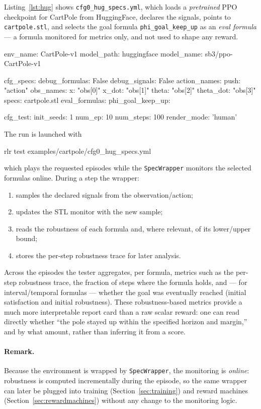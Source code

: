 Listing~\ref{lst:hug} shows \texttt{cfg0\_hug\_specs.yml}, which loads a
\emph{pretrained} PPO checkpoint for CartPole from HuggingFace, declares the
signals, points to \texttt{cartpole.stl}, and selects the goal formula
\texttt{phi\_goal\_keep\_up} as an \emph{eval formula} --- a formula monitored
for metrics only, and not used to shape any reward.

\begin{cfglisting}[caption={Testing a HuggingFace pretrained PPO on CartPole
against an STL formula (\texttt{cfg0\_hug\_specs.yml}).},label={lst:hug}]
env_name: CartPole-v1
model_path: huggingface
model_name: sb3/ppo-CartPole-v1

cfg_specs:
  debug_formulas: False
  debug_signals: False
  action_names:
    push: "action"
  obs_names:
    x:     "obs[0]"
    x_dot: "obs[1]"
    theta: "obs[2]"
    theta_dot: "obs[3]"
  specs: cartpole.stl
  eval_formulas:
    phi_goal_keep_up:

cfg_test:
  init_seeds: 1
  num_ep: 10
  num_steps: 100
  render_mode: 'human'
\end{cfglisting}

\noindent
The run is launched with
\begin{center}\ttfamily rlr test examples/cartpole/cfg0\_hug\_specs.yml
\end{center}
which plays the requested episodes while the \texttt{SpecWrapper} monitors the
selected formulas online. During a step the wrapper:
\begin{enumerate}
  \item samples the declared signals from the observation/action;
  \item updates the STL monitor with the new sample;
  \item reads the robustness of each formula and, where relevant, of its lower/upper
  bound;
  \item stores the per-step robustness trace for later analysis.
\end{enumerate}

Across the episodes the tester aggregates, per formula, metrics such as the
per-step robustness trace, the fraction of steps where the formula holds, and ---
for interval/temporal formulas --- whether the goal was eventually reached (initial
satisfaction and initial robustness). These robustness-based metrics provide a much
more interpretable report card than a raw scalar reward: one can read directly
whether ``the pole stayed up within the specified horizon and margin,'' and by what
amount, rather than inferring it from a score.

\paragraph{Remark.} Because the environment is wrapped by \texttt{SpecWrapper}, the
monitoring is \emph{online}: robustness is computed incrementally during the
episode, so the same wrapper can later be plugged into training
(Section~\ref{sec:training}) and reward machines (Section~\ref{sec:rewardmachines})
without any change to the monitoring logic.

